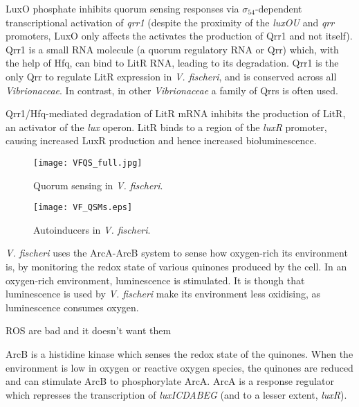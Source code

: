 LuxO phosphate inhibits quorum sensing responses via $\sigma_{54}$-dependent transcriptional activation of \textit{qrr1}\cite{Miyamoto2000,Miyashiro2010} (despite the proximity of the \textit{luxOU} and \textit{qrr} promoters, LuxO only affects the activates the production of Qrr1 and not itself\cite{Lilley2000}). Qrr1 is a small RNA molecule (a quorum regulatory RNA or Qrr) which, with the help of Hfq, can bind to LitR RNA, leading to its degradation\cite{Miyashiro2010}. Qrr1 is the only Qrr to regulate LitR expression in \textit{V. fischeri}, and is conserved across all \textit{Vibrionaceae}\cite{Miyashiro2010}. In contrast, in other \textit{Vibrionaceae} a family of Qrrs is often used\cite{Lenz2004}.

Qrr1/Hfq-mediated degradation of LitR mRNA inhibits the production of LitR, an activator of the \textit{lux} operon. LitR binds to a region of the \textit{luxR} promoter, causing increased LuxR production and hence increased bioluminescence\cite{Fidopiastis2002}.


\begin{figure}[H]
	\begin{center}
		\texttt{[image: VFQS\_full.jpg]}
		\caption{Quorum sensing in \textit{V. fischeri}. \label{fgr:VFQS_full}}
	\end{center}
\end{figure}

\begin{figure}[H]
	\begin{center}
		\texttt{[image: VF\_QSMs.eps]}
		\caption{Autoinducers in \textit{V. fischeri}. \label{fgr:VF_autoinducers}}
	\end{center}
\end{figure}

 \label{sec:O2}

\textit{V. fischeri} uses the ArcA-ArcB system to sense how oxygen-rich its environment is, by monitoring the redox state of various quinones produced by the cell. 
In an oxygen-rich environment, luminescence is stimulated. It is though that luminescence is used by \textit{V. fischeri} make its environment less oxidising, as luminescence consumes oxygen. 

ROS are bad and it doesn't want them\cite{Visick2000}

 ArcB is a histidine kinase which senses the redox state of the quinones. When the environment is low in oxygen or reactive oxygen species, the quinones are reduced and can stimulate ArcB to phosphorylate ArcA. ArcA is a response regulator which represses the transcription of \textit{luxICDABEG} (and to a lesser extent, \textit{luxR}). 

